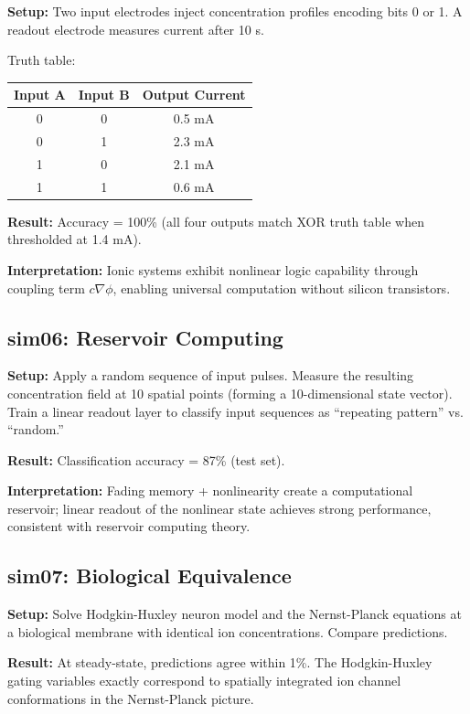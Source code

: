 \documentclass[11pt]{article}
\begin{document}
\textbf{Setup:} Two input electrodes inject concentration profiles encoding bits 0 or 1. A readout electrode measures current after 10 s.

Truth table:
\begin{center}
\begin{tabular}{|cc|c|}
\hline
Input A & Input B & Output Current \\
\hline
0 & 0 & 0.5 mA \\
0 & 1 & 2.3 mA \\
1 & 0 & 2.1 mA \\
1 & 1 & 0.6 mA \\
\hline
\end{tabular}
\end{center}

\textbf{Result:} Accuracy = 100\% (all four outputs match XOR truth table when thresholded at 1.4 mA).

\textbf{Interpretation:} Ionic systems exhibit nonlinear logic capability through coupling term $c \nabla \phi$, enabling universal computation without silicon transistors.

\subsection{sim06: Reservoir Computing}

\textbf{Setup:} Apply a random sequence of input pulses. Measure the resulting concentration field at 10 spatial points (forming a 10-dimensional state vector). Train a linear readout layer to classify input sequences as ``repeating pattern'' vs. ``random.''

\textbf{Result:} Classification accuracy = 87\% (test set).

\textbf{Interpretation:} Fading memory + nonlinearity create a computational reservoir; linear readout of the nonlinear state achieves strong performance, consistent with reservoir computing theory.

\subsection{sim07: Biological Equivalence}

\textbf{Setup:} Solve Hodgkin-Huxley neuron model and the Nernst-Planck equations at a biological membrane with identical ion concentrations. Compare predictions.

\textbf{Result:} At steady-state, predictions agree within 1\%. The Hodgkin-Huxley gating variables exactly correspond to spatially integrated ion channel conformations in the Nernst-Planck picture.
\end{document}
